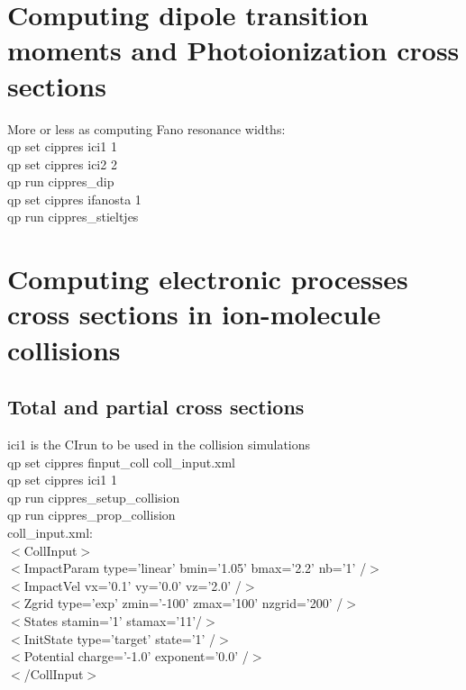 \documentclass[a4paper, 10 pt]{report}
\begin{document}
\section{Computing dipole transition moments and Photoionization cross sections}

\noindent More or less as computing Fano resonance widths:\\
qp set cippres ici1 1 \\
qp set cippres ici2 2 \\
qp run cippres\_dip \\
qp set cippres ifanosta 1  \\
qp run cippres\_stieltjes  \\

\section{Computing electronic processes cross sections in ion-molecule collisions}

\subsection{Total and partial cross sections}

\noindent ici1 is the CIrun to be used in the collision simulations\\

\noindent qp set cippres finput\_coll coll\_input.xml \\
qp set cippres ici1 1\\
qp run cippres\_setup\_collision\\
qp run cippres\_prop\_collision\\

\noindent coll\_input.xml:\\

\noindent $<$CollInput$>$\\
$<$ImpactParam type='linear' bmin='1.05' bmax='2.2' nb='1' /$>$\\
$<$ImpactVel vx='0.1' vy='0.0' vz='2.0' /$>$\\
$<$Zgrid type='exp' zmin='-100' zmax='100' nzgrid='200' /$>$\\

$<$States stamin='1' stamax='11'/$>$\\

$<$InitState   type='target' state='1' /$>$\\
$<$Potential charge='-1.0' exponent='0.0' /$>$\\
$<$/CollInput$>$\\
\end{document}

